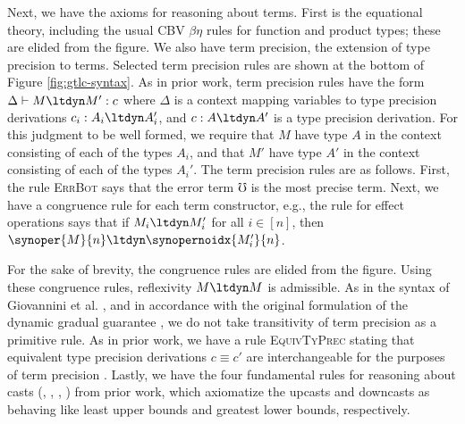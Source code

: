 \documentclass[acmsmall,screen,review,anonymous]{acmart}
\theoremstyle{remark}
\begin{document}
Next, we have the axioms for reasoning about terms. First is the equational
theory, including the usual CBV $\beta\eta$ rules for function and product
types; these are elided from the figure. 
%
We also have term precision, the extension of type precision to terms.
Selected term precision rules are shown at the bottom of Figure \ref{fig:gtlc-syntax}.
%
As in prior work, term precision rules have the form $\Delta \vdash M \ltdyn M'
: c$ where $\Delta$ is a context mapping variables to type precision derivations
$c_i : A_i \ltdyn A_i'$, and $c : A \ltdyn A'$ is a type precision derivation.
%
For this judgment to be well formed, we require that $M$ have type $A$ in the
context consisting of each of the types $A_i$, and that $M'$ have type $A'$ in
the context consisting of each of the types $A_i'$.
%
%
The term precision rules are as follows. First, the rule \textsc{ErrBot} says
that the error term $\mho$ is the most precise term.
%
Next, we have a congruence rule for each term constructor, e.g., the rule for
effect operations says that if $M_i \ltdyn M_i'$ for all $i \in [n]$, then
$\synoper{M}{n} \ltdyn \synopernoidx{M_i'}{n}$.

For the sake of brevity, the congruence rules are elided from the
figure.
%
Using these congruence rules, reflexivity $M \ltdyn M$ is admissible. As in the
syntax of Giovannini et al. \cite{gtt-sgdt}, and in accordance with the original
formulation of the dynamic gradual guarantee \cite{siek_et_al:LIPIcs:2015:5031},
we do not take transitivity of term precision as a primitive rule.
%
As in prior work, we have a rule \textsc{EquivTyPrec} stating that equivalent
type precision derivations $c \equiv c'$ are interchangeable for the purposes of
term precision \cite{gtt-sgdt}.
%
Lastly, we have the four fundamental rules for reasoning about casts (\upl,
\upr, \dnl, \dnr) from prior work, which axiomatize the upcasts and downcasts as
behaving like least upper bounds and greatest lower bounds, respectively.


\end{document}
